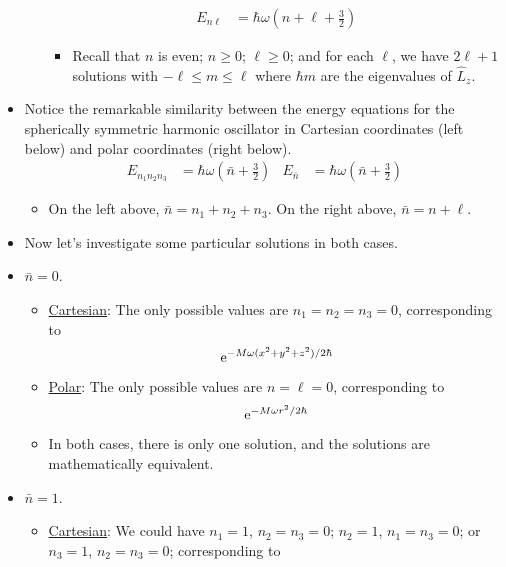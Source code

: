 \documentclass[../notes.tex]{subfiles}
\begin{document}
\begin{itemize}
\begin{itemize}
\begin{align*}
            E_{n\ell} &= \hbar\omega\left( n+\ell+\frac{3}{2} \right)
        \end{align*}
        \begin{itemize}
            \item Recall that $n$ is even; $n\geq 0$; $\ell\geq 0$; and for each $\ell$, we have $2\ell+1$ solutions with $-\ell\leq m\leq\ell$ where $\hbar m$ are the eigenvalues of $\hat{L}_z$.
        \end{itemize}
    \end{itemize}
    \item Notice the remarkable similarity between the energy equations for the spherically symmetric harmonic oscillator in Cartesian coordinates (left below) and polar coordinates (right below).
    \begin{align*}
        E_{n_1n_2n_3} &= \hbar\omega\left( \bar{n}+\frac{3}{2} \right)&
        E_{\bar{n}} &= \hbar\omega\left( \bar{n}+\frac{3}{2} \right)
    \end{align*}
    \begin{itemize}
        \item On the left above, $\bar{n}=n_1+n_2+n_3$. On the right above, $\bar{n}=n+\ell$.
    \end{itemize}
    \item Now let's investigate some particular solutions in both cases.
    \item $\bar{n}=0$.
    \begin{itemize}
        \item \underline{Cartesian}: The only possible values are $n_1=n_2=n_3=0$, corresponding to
        \begin{equation*}
            \e[-M\omega(x^2+y^2+z^2)/2\hbar]
        \end{equation*}
        \item \underline{Polar}: The only possible values are $n=\ell=0$, corresponding to
        \begin{equation*}
            \e[-M\omega r^2/2\hbar]
        \end{equation*}
        \item In both cases, there is only one solution, and the solutions are mathematically equivalent.
    \end{itemize}
    \item $\bar{n}=1$.
    \begin{itemize}
        \item \underline{Cartesian}: We could have $n_1=1$, $n_2=n_3=0$; $n_2=1$, $n_1=n_3=0$; or $n_3=1$, $n_2=n_3=0$; corresponding to

\end{itemize}
\end{itemize}
\end{document}
